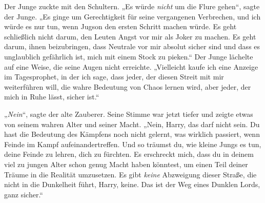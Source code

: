 Der Junge zuckte mit den Schultern. „Es würde \emph{nicht} um die Flure gehen“, sagte der Junge. „Es ginge um Gerechtigkeit für seine vergangenen Verbrechen, und ich würde es nur tun, wenn Jugson den ersten Schritt machen würde. Es geht schließlich nicht darum, den Leuten Angst vor mir als Joker zu machen. Es geht darum, ihnen beizubringen, dass Neutrale vor mir absolut sicher sind und dass es unglaublich gefährlich ist, mich mit einem Stock zu pieken.“ Der Junge lächelte auf eine Weise, die seine Augen nicht erreichte. „Vielleicht kaufe ich eine Anzeige im Tagesprophet, in der ich sage, dass jeder, der diesen Streit mit mir weiterführen will, die wahre Bedeutung von Chaos lernen wird, aber jeder, der mich in Ruhe lässt, sicher ist.“

„\emph{Nein}“, sagte der alte Zauberer. Seine Stimme war jetzt tiefer und zeigte etwas von seinem wahren Alter und seiner Macht. „Nein, Harry, das darf nicht sein. Du hast die Bedeutung des Kämpfens noch nicht gelernt, was wirklich passiert, wenn Feinde im Kampf aufeinandertreffen. Und so träumst du, wie kleine Jungs es tun, deine Feinde zu lehren, dich zu fürchten. Es erschreckt mich, dass du in deinem viel zu jungen Alter schon genug Macht haben könntest, um einen Teil deiner Träume in die Realität umzusetzen. Es gibt \emph{keine} Abzweigung dieser Straße, die nicht in die Dunkelheit führt, Harry, keine. Das ist der Weg eines Dunklen Lords, ganz sicher.“

